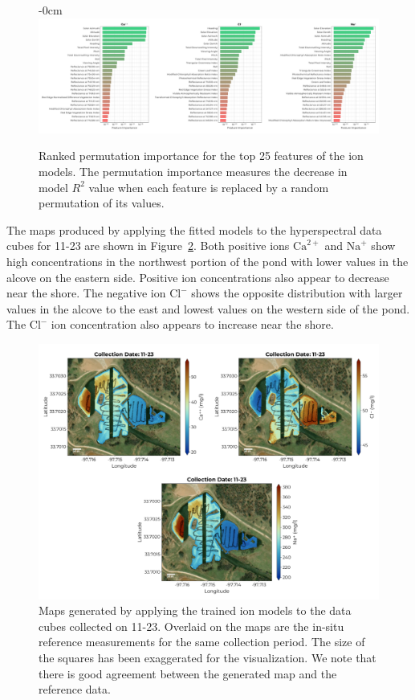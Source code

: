 \documentclass[remotesensing,article,submit,pdftex,moreauthors]{Definitions/mdpi}
\begin{document}
\begin{figure}
\begin{adjustwidth}{-\extralength}{0cm}
\centering
\includegraphics[width=18 cm]{paper/figures/results/fits/ions-ranking.pdf}
\end{adjustwidth}
\caption{Ranked permutation importance for the top 25 features of the ion models. The permutation importance measures the decrease in model $R^2$ value when each feature is replaced by a random permutation of its values.\label{fig:ions-fi}}
\end{figure}  

The maps produced by applying the fitted models to the hyperspectral data cubes for 11-23 are shown in Figure~\ref{fig:map-ions}. Both positive ions $\mathrm{Ca}^{2+}$ and $\mathrm{Na}^{+}$ show high concentrations in the northwest portion of the pond with lower values in the alcove on the eastern side. Positive ion concentrations also appear to decrease near the shore. The negative ion $\mathrm{Cl}^{-}$ shows the opposite distribution with larger values in the alcove to the east and lowest values on the western side of the pond. The $\mathrm{Cl}^{-}$ ion concentration also appears to increase near the shore.

\begin{figure}
\centering
\includegraphics[width=\columnwidth]{paper/figures/results/maps/ions.pdf}
\caption{Maps generated by applying the trained ion models to the data cubes collected on 11-23. Overlaid on the maps are the in-situ reference measurements for the same collection period. The size of the squares has been exaggerated for the visualization. We note that there is good agreement between the generated map and the reference data. \label{fig:map-ions}}
\end{figure}  
\end{document}
